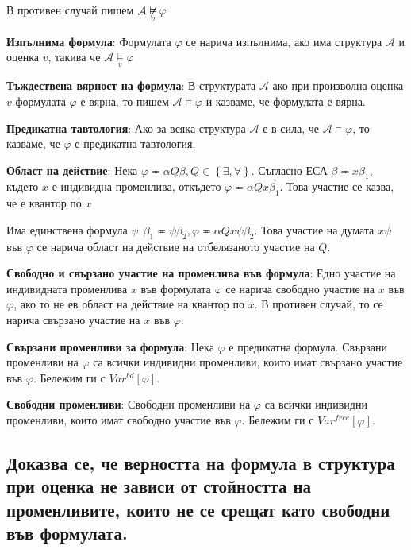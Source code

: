 \documentclass{article}
\renewcommand{\\}{\newline}
\begin{document}
В противен случай пишем \(\mathcal{A} \not \underset{v}{\vDash} \varphi\)  

\textbf{Изпълнима формула}: Формулата \(\varphi\) се нарича изпълнима, ако има структура \(\mathcal{A}\) и оценка \(v\), такива че \(\mathcal{A} \underset{v}{\vDash} \varphi\)     

\textbf{Тъждествена вярност на формула}: В структурата \(\mathcal{A}\) ако при произволна оценка \(v\) формулата \(\varphi\) е вярна, то пишем \(\mathcal{A} \vDash \varphi\) и казваме, че формулата е вярна.    

\textbf{Предикатна тавтология}: Ако за всяка структура \(\mathcal{A}\) е в сила, че \(\mathcal{A} \vDash \varphi\), то казваме, че \(\varphi\) е предикатна тавтология. 

\textbf{Област на действие}: Нека \(\varphi \eqcirc \alpha Q \beta, Q \in \left\{\exists, \forall\right\}\). Съгласно ЕСА \(\beta \eqcirc x \beta_1\), където \(x\) е индивидна променлива, откъдето \(\varphi \eqcirc \alpha Q x \beta_1\). Това участие се казва, че е квантор по \(x\) 

Има единствена формула \(\psi: \beta_1 \eqcirc \psi \beta_2, \varphi \eqcirc \alpha Qx \psi \beta_2\). Това участие на думата \(x \psi\) във \(\varphi\)  се нарича област на действие на отбелязаното участие на \(Q\).   

\textbf{Свободно и свързано участие на променлива във формула}: Едно участие на индивидната променлива \(x\) във формулата \(\varphi\) се нарича свободно участие на \(x\) във \(\varphi\), ако то не ев област на действие на квантор по \(x\). В противен случай, то се нарича свързано участие на \(x\) във \(\varphi\). 

\textbf{Свързани променливи за формула}: Нека \(\varphi\) е предикатна формула. Свързани променливи на \(\varphi\) са всички индивидни променливи, които имат свързано участие във \(\varphi\). Бележим ги с \(Var^{bd}[\varphi]\).

\textbf{Свободни променливи}: Свободни променливи на \(\varphi\) са всички индивидни променливи, които имат свободно участие във \(\varphi\). Бележим ги с \(Var^{free}[\varphi]\).




\subsection{Доказва се, че верността на формула в структура при оценка не зависи от стойността на променливите, които не се срещат като свободни във формулата.}
\end{document}
